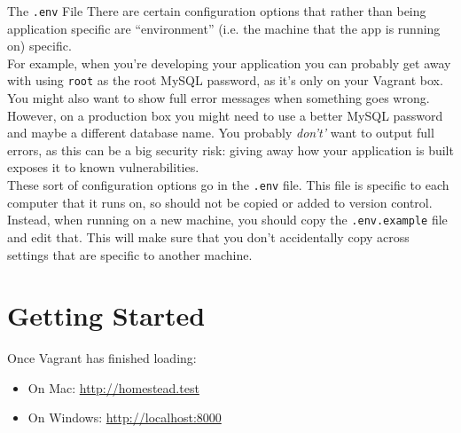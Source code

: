 \begin{infobox}{The \texttt{.env} File}
    There are certain configuration options that rather than being application specific are ``environment'' (i.e. the machine that the app is running on) specific.
    \\

    For example, when you're developing your application you can probably get away with using \texttt{root} as the root MySQL password, as it's only on your Vagrant box. You might also want to show full error messages when something goes wrong.
    \\

    However, on a production box you might need to use a better MySQL password and maybe a different database name. You probably \textit{don't'} want to output full errors, as this can be a big security risk: giving away how your application is built exposes it to known vulnerabilities.
    \\

    These sort of configuration options go in the \texttt{.env} file. This file is specific to each computer that it runs on, so should not be copied or added to version control. Instead, when running on a new machine, you should copy the \texttt{.env.example} file and edit that. This will make sure that you don't accidentally copy across settings that are specific to another machine.
\end{infobox}


\section{Getting Started}

Once Vagrant has finished loading:

\begin{itemize}
    \item On Mac: \href{http://homestead.test}{http://homestead.test}
    \item On Windows: \href{http://localhost:8000}{http://localhost:8000}
\end{itemize}


\pagebreak

